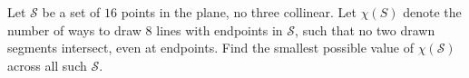 Let $\mathcal S$ be a set of $16$ points in the plane, no three collinear. Let $\chi(S)$ denote the number of ways to draw $8$ lines with endpoints in $\mathcal S$, such that no two drawn segments intersect, even at endpoints. Find the smallest possible value of $\chi(\mathcal S)$ across all such $\mathcal S$.